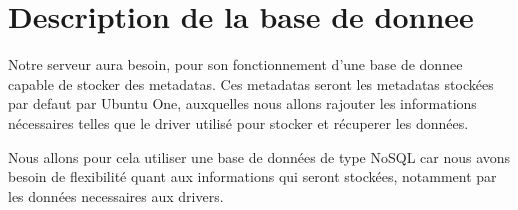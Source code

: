 \section{Description de la base de donnee}
Notre serveur aura besoin, pour son fonctionnement d'une base de donnee capable de stocker des metadatas.
Ces metadatas seront les metadatas stockées par defaut par Ubuntu One, auxquelles nous allons rajouter les informations nécessaires telles que le driver utilisé pour stocker et récuperer les données.

Nous allons pour cela utiliser une base de données de type NoSQL car nous avons besoin de flexibilité quant aux informations qui seront stockées, notamment par les données necessaires aux drivers.
